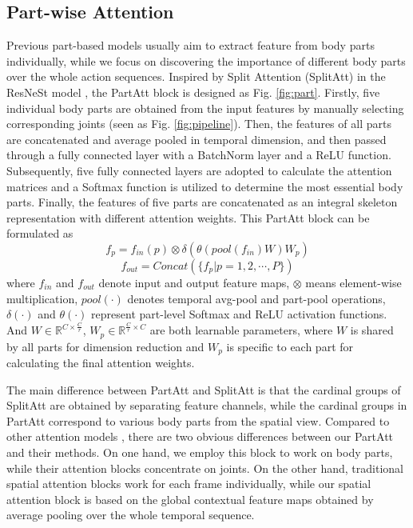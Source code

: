 \documentclass[sigconf]{acmart}
\begin{document}
\subsection{Part-wise Attention}
\label{ssec:pa}

Previous part-based models usually aim to extract feature from body parts individually, while we focus on discovering the importance of different body parts over the whole action sequences. Inspired by Split Attention (SplitAtt) in the ResNeSt model \cite{resnest2020zhang}, the PartAtt block is designed as Fig. \ref{fig:part}. Firstly, five individual body parts are obtained from the input features by manually selecting corresponding joints (seen as Fig. \ref{fig:pipeline}). Then, the features of all parts are concatenated and average pooled in temporal dimension, and then passed through a fully connected layer with a BatchNorm layer and a ReLU function. Subsequently, five fully connected layers are adopted to calculate the attention matrices and a Softmax function is utilized to determine the most essential body parts. Finally, the features of five parts are concatenated as an integral skeleton representation with different attention weights. This PartAtt block can be formulated as
\begin{equation}
f_{p}=f_{in}(p)\otimes\delta(\theta(pool(f_{in})W)W_p)
\end{equation}
\begin{equation}
f_{out}=Concat(\{f_p|p=1,2,\cdots,P\})
\end{equation}
where $f_{in}$ and $f_{out}$ denote input and output feature maps, $\otimes$ means element-wise multiplication, $pool(\cdot)$ denotes temporal avg-pool and part-pool operations, $\delta(\cdot)$ and $\theta(\cdot)$ represent part-level Softmax and ReLU activation functions. And $W\in\mathbb{R}^{C\times\frac{C}{r}}$, $W_p\in\mathbb{R}^{\frac{C}{r}\times C}$ are both learnable parameters, where $W$ is shared by all parts for dimension reduction and $W_p$ is specific to each part for calculating the final attention weights.

The main difference between PartAtt and SplitAtt is that the cardinal groups of SplitAtt are obtained by separating feature channels, while the cardinal groups in PartAtt correspond to various body parts from the spatial view. Compared to other attention models \cite{song2017end, si2019attention}, there are two obvious differences between our PartAtt and their methods. On one hand, we employ this block to work on body parts, while their attention blocks concentrate on joints. On the other hand, traditional spatial attention blocks work for each frame individually, while our spatial attention block is based on the global contextual feature maps obtained by average pooling over the whole temporal sequence.
\end{document}
